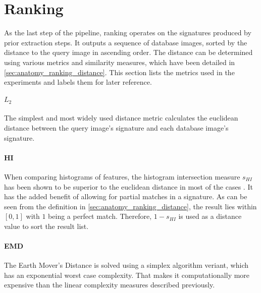 \section{Ranking}

As the last step of the pipeline, ranking operates on the signatures produced
by prior extraction steps. It outputs a sequence of database images, sorted by
the distance to the query image in ascending order. The distance can be
determined using various metrics and similarity measures, which have been
detailed in \ref{sec:anatomy_ranking_distance}. This section lists the metrics
used in the experiments and labels them for later reference.

\paragraph{$L_2$}

The simplest and most widely used distance metric calculates the euclidean
distance between the query image's signature and each database image's
signature.

\paragraph{HI}

When comparing histograms of features, the histogram intersection measure
$s_{HI}$ has been shown to be superior to the euclidean distance in most of the
cases \autocite{wu_beyond_2009}. It has the added benefit of allowing for
partial matches in a signature. As can be seen from the definition in
\ref{sec:anatomy_ranking_distance}, the result lies within $[0, 1]$ with $1$
being a perfect match. Therefore, $1 - s_{HI}$ is used as a distance value to
sort the result list.

\paragraph{EMD}

The Earth Mover's Distance is solved using a simplex algorithm veriant, which
has an exponential worst case complexity. That makes it computationally more
expensive than the linear complexity measures described previously.

